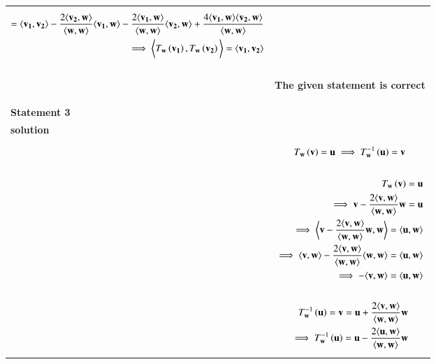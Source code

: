 \documentclass[journal,12pt]{IEEEtran}
\begin{document}
\begin{longtable}{|l|l|}
{\begin{align}
=\langle \mathbf{v_1},\mathbf{v_2}\rangle-\frac{2\langle \mathbf{v_2},\mathbf{w} \rangle}{\langle \mathbf{w}, \mathbf{w}\rangle}\langle\mathbf{v_1},\mathbf{w}\rangle-\frac{2\langle \mathbf{v_1},\mathbf{w} \rangle}{\langle \mathbf{w},\mathbf{w} \rangle}\langle\mathbf{v_2},\mathbf{w}\rangle+\frac{4\langle\mathbf{v_1},\mathbf{w}\rangle \langle\mathbf{v_2},\mathbf{w}\rangle}{\langle \mathbf{w},\mathbf{w}\rangle}\\
\implies\bigg\langle T_\mathbf{w}\left(\mathbf{v_1}\right),T_\mathbf{w}\left(\mathbf{v_2}\right)\bigg\rangle=\langle \mathbf{v_1},\mathbf{v_2}\rangle
\end{align}}\\
& \parbox{13cm}{\begin{center}
\textbf{The given statement is correct}
\end{center}}\\
\hline 
\textbf{Statement 3} & \\
\hline
\textbf{solution} & \\  & \parbox{10cm} {\begin{align}
T_\mathbf{w}\left(\mathbf{v}\right)=\mathbf{u}\implies T_\mathbf{w}^{-1}\left(\mathbf{u}\right)=\mathbf{v}
\end{align}}\\
& \\& \parbox{10cm} {\begin{align}
T_\mathbf{w}\left(\mathbf{v}\right)=\mathbf{u}\\
   \implies \mathbf{v}-\frac{2\langle \mathbf{v},\mathbf{w} \rangle}{\langle \mathbf{w},\mathbf{w} \rangle}\mathbf{w}=\mathbf{u}\label{eq14}\\
   \implies \bigg\langle\mathbf{v}-\frac{2\langle \mathbf{v},\mathbf{w} \rangle}{\langle \mathbf{w},\mathbf{w} \rangle}\mathbf{w}, \mathbf{w}\bigg\rangle=\langle \mathbf{u},\mathbf{w}\rangle\\
   \implies\langle \mathbf{v},\mathbf{w} \rangle-\frac{2\langle \mathbf{v},\mathbf{w} \rangle}{\langle \mathbf{w},\mathbf{w} \rangle}\langle\mathbf{w}, \mathbf{w}\rangle=\langle \mathbf{u},\mathbf{w}\rangle\\
   \implies -\langle \mathbf{v},\mathbf{w}\rangle=\langle \mathbf{u},\mathbf{w}\rangle \label{eq17}
\end{align}}\\
& \\
& \parbox{10cm} {\begin{align}
T_\vec{w}^{-1}\brak{\vec{u}}=\vec{v}=\vec{u}+\frac{2\langle \vec{v},\vec{w} \rangle}{\langle \vec{w},\vec{w} \rangle}\vec{w} \\
\implies T_\vec{w}^{-1}\brak{\vec{u}}=\vec{u}-\frac{2\langle \vec{u},\vec{w} \rangle}{\langle \vec{w},\vec{w} \rangle}\vec{w}\\

\end{align}}
\end{longtable}
\end{document}
